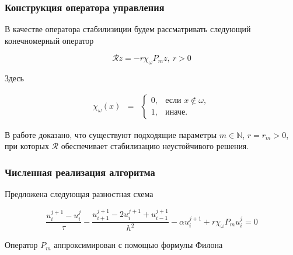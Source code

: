 \documentclass{beamer}
\newcommand{\operator}[1]{\mathcal{R}{#1}}
\begin{document}
\begin{frame}
\frametitle{Конструкция оператора управления}

В качестве оператора стабилизиции будем рассматривать следующий конечномерный оператор

\begin{block}{}
\begin{equation}
	\operator{z} = -r\chi_{\omega}P_mz, \ r > 0
\end{equation}
\end{block}
Здесь 
\begin{block}{}
	\begin{equation}
    \begin{matrix}
	    \chi_{\omega}(x) & =
	    & \left\{
	    \begin{matrix}
	    0, & \mbox{если } x \notin \omega, \\
	    1, & \mbox{иначе. }
	    \end{matrix} \right.
	    \end{matrix}
    \end{equation}
\end{block}

В работе доказано, что существуют подходящие параметры $m \in \mathbb{N}$, $r = r_m > 0$, при которых $\operator{}$ обеспечивает стабилизацию неустойчивого решения.

\end{frame}


\begin{frame}
\frametitle{Численная реализация алгоритма}
Предложена следующая разностная схема \\
\begin{block}{}
	\begin{equation}\label{scheme}
		\frac{u^{j + 1}_i - u^j_i}{\tau} - \frac{u_{i + 1}^{j + 1} - 2u_{i}^{j + 1} + u_{i - 1}^{j + 1}}{h^2} - \alpha u^{j + 1}_i + r\chi_{\omega}P_m u^j_i = 0
	\end{equation}
\end{block}

Оператор $P_m$ аппроксимирован с помощью формулы Филона\\

\end{frame}
\end{document}
